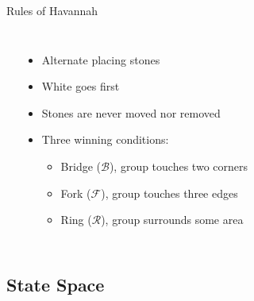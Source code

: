 \documentclass{beamer} %
\begin{document}
\begin{frame}{Rules of Havannah}
\begin{columns}
\begin{center}
\begin{HavannahBoard}[board size=6,coordinate style=classical]
\end{HavannahBoard}
\end{center}

\begin{itemize}
\item Alternate placing stones
\item White goes first
\item Stones are never moved nor removed
\item Three winning conditions:
	\begin{itemize}
		\item Bridge ($\mathcal B$), group touches two corners
		\item Fork ($\mathcal F$), group touches three edges
		\item Ring ($\mathcal R$), group surrounds some area
	\end{itemize}
\end{itemize}
\end{columns}
\end{frame}


\subsection{State Space}
\end{document}

